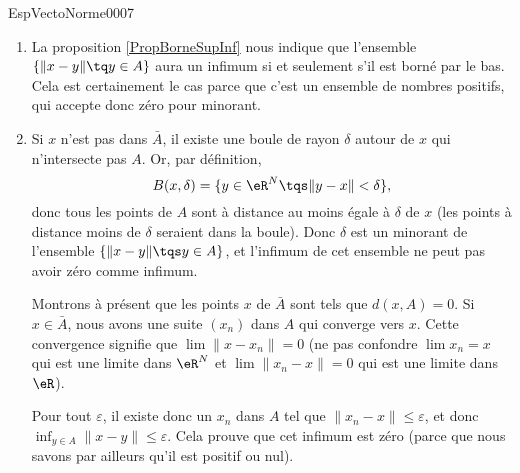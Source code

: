 \begin{corrige}{EspVectoNorme0007}

	\begin{enumerate}
		\item
			La proposition \ref{PropBorneSupInf} nous indique que l'ensemble $\{ \| x-y \|\tq y\in A \}$ aura un infimum si et seulement s'il est borné par le bas. Cela est certainement le cas parce que c'est un ensemble de nombres positifs, qui accepte donc zéro pour minorant.

		\item
			Si $x$ n'est pas dans $\bar A$, il existe une boule de rayon $\delta$ autour de $x$ qui n'intersecte pas $A$. Or, par définition,
			\begin{equation}
				B(x,\delta)=\{ y\in\eR^N\tqs\| y-x \|<\delta \},
			\end{equation}
			donc tous les points de $A$ sont à distance au moins égale à $\delta$ de $x$ (les points à distance moins de $\delta$ seraient dans la boule). Donc $\delta$ est un minorant de l'ensemble $\{ \| x-y \|\tqs y\in A \}$, et l'infimum de cet ensemble ne peut pas avoir zéro comme infimum.

			Montrons à présent que les points $x$ de $\bar A$ sont tels que $d(x,A)=0$. Si $x\in\bar A$, nous avons une suite $(x_n)$ dans $A$ qui converge vers $x$. Cette convergence signifie que $\lim\| x-x_n \|=0$ (ne pas confondre $\lim x_n=x$ qui est une limite dans $\eR^N$ et $\lim\| x_n-x \|=0$ qui est une limite dans $\eR$).

			Pour tout $\varepsilon$, il existe donc un $x_n$ dans $A$ tel que $\| x_n-x \|\leq\varepsilon$, et donc $\inf_{y\in A}\| x-y \|\leq\varepsilon$. Cela prouve que cet infimum est zéro (parce que nous savons par ailleurs qu'il est positif ou nul).
			
	\end{enumerate}

\end{corrige}
